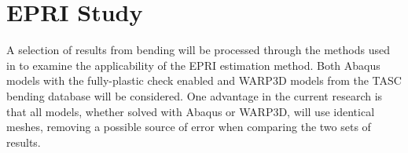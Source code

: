 \section{EPRI \hone Study}
\label{chap:h1}

A selection of \J results from bending will be processed through the methods used in  to examine the applicability of the EPRI estimation method.
Both Abaqus models with the fully-plastic check enabled and WARP3D models from the TASC bending database will be considered.
One advantage in the current research is that all models, whether solved with Abaqus or WARP3D, will use identical meshes, removing a possible source of error when comparing the two sets of results.